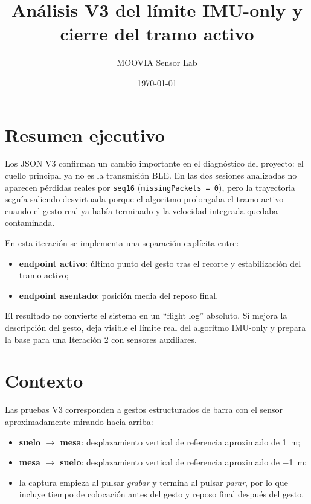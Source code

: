 \documentclass[11pt,a4paper]{article}
\title{An\'alisis V3 del l\'imite IMU-only y cierre del tramo activo}
\author{MOOVIA Sensor Lab}
\date{\today}
\begin{document}
\maketitle

\section*{Resumen ejecutivo}
Los JSON V3 confirman un cambio importante en el diagn\'ostico del proyecto: el cuello principal ya no es la transmisi\'on BLE. En las dos sesiones analizadas no aparecen p\'erdidas reales por \texttt{seq16} (\texttt{missingPackets = 0}), pero la trayectoria segu\'ia saliendo desvirtuada porque el algoritmo prolongaba el tramo activo cuando el gesto real ya hab\'ia terminado y la velocidad integrada quedaba contaminada.

En esta iteraci\'on se implementa una separaci\'on expl\'icita entre:
\begin{itemize}[leftmargin=14pt]
  \item \textbf{endpoint activo}: \'ultimo punto del gesto tras el recorte y estabilizaci\'on del tramo activo;
  \item \textbf{endpoint asentado}: posici\'on media del reposo final.
\end{itemize}

El resultado no convierte el sistema en un ``flight log'' absoluto. S\'i mejora la descripci\'on del gesto, deja visible el l\'imite real del algoritmo IMU-only y prepara la base para una Iteraci\'on 2 con sensores auxiliares.

\section{Contexto}
Las pruebas V3 corresponden a gestos estructurados de barra con el sensor aproximadamente mirando hacia arriba:
\begin{itemize}[leftmargin=14pt]
  \item \textbf{suelo $\rightarrow$ mesa}: desplazamiento vertical de referencia aproximado de \SI{1}{m};
  \item \textbf{mesa $\rightarrow$ suelo}: desplazamiento vertical de referencia aproximado de \SI{-1}{m};
  \item la captura empieza al pulsar \emph{grabar} y termina al pulsar \emph{parar}, por lo que incluye tiempo de colocaci\'on antes del gesto y reposo final despu\'es del gesto.
\end{itemize}
\end{document}
